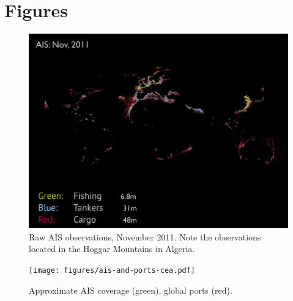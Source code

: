 \chapter{Figures}
\label{sec:figures}

\begin{figure}[htbp]
  \centering
  \hspace*{-.3in}
  \includegraphics[width=140mm]{figures/ais-nov-2011.pdf}
  \caption[AIS observations, November 2011]{Raw AIS observations, November 2011. Note the observations located in the Hoggar Mountains in Algeria.}
  \label{fig:ais-obs-nov-2011}
\end{figure}

\begin{figure}
  \centering
  \hspace*{-.3in}
  \texttt{[image: figures/ais-and-ports-cea.pdf]}
  \caption[AIS coverage]{Approximate AIS coverage (green), global ports (red).}
  \label{fig:ais-coverage}
\end{figure}

